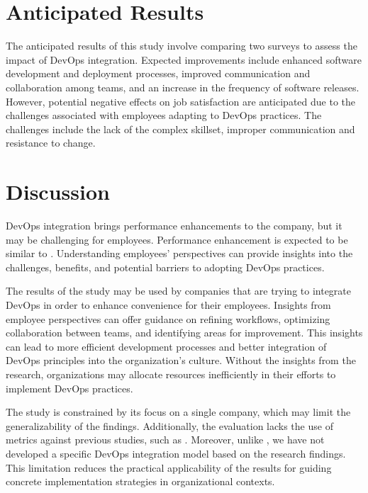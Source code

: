 \documentclass[oneside,final,12pt,a4paper]{extreport}
\begin{document}
\section{Anticipated Results}

The anticipated results of this study involve comparing two surveys to assess the impact of DevOps integration. Expected improvements include enhanced software development and deployment processes, improved communication and collaboration among teams, and an increase in the frequency of software releases. However, potential negative effects on job satisfaction are anticipated due to the challenges associated with employees adapting to DevOps practices. The challenges include the lack of the complex skillset, improper communication and resistance to change.

\section{Discussion}

DevOps integration brings performance enhancements to the company, but it may be challenging for employees. Performance enhancement is expected to be similar to \cite{21}. Understanding employees' perspectives can provide insights into the challenges, benefits, and potential barriers to adopting DevOps practices. 

The results of the study may be used by companies that are trying to integrate DevOps in order to enhance convenience for their employees. Insights from employee perspectives can offer guidance on refining workflows, optimizing collaboration between teams, and identifying areas for improvement. This insights can lead to more efficient development processes and better integration of DevOps principles into the organization's culture. Without the insights from the research, organizations may allocate resources inefficiently in their efforts to implement DevOps practices.

\newpage

The study is constrained by its focus on a single company, which may limit the generalizability of the findings. Additionally, the evaluation lacks the use of metrics against previous studies, such as \cite{15}. Moreover, unlike \cite{16}, we have not developed a specific DevOps integration model based on the research findings. This limitation reduces the practical applicability of the results for guiding concrete implementation strategies in organizational contexts.

\newpage
\printbibliography[heading=bibintoc,title={References}]
\end{document}
